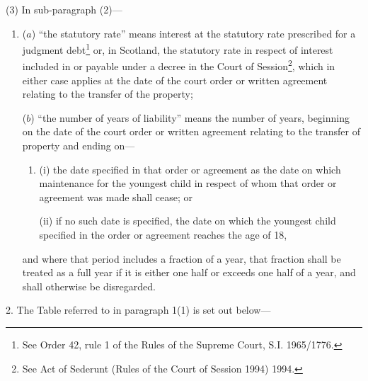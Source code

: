 \documentclass[a4paper]{article}
\begin{document}
(3) In sub-paragraph (2)—
\begin{enumerate}\item[]
($a$) “the statutory rate” means interest at the statutory rate prescribed for a
judgment debt\footnote{\frenchspacing See Order 42, rule 1 of the Rules of the Supreme Court, S.I. 1965/1776.} or, in Scotland, the statutory rate in respect of interest
included in or payable under a decree in the Court of Session\footnote{\frenchspacing See Act of Sederunt (Rules of the Court of Session 1994) 1994.}, which in
either case applies at the date of the court order or written agreement relating
to the transfer of the property;

($b$) “the number of years of liability” means the number of years, beginning on
the date of the court order or written agreement relating to the transfer of
property and ending on—
\begin{enumerate}\item[]
(i) the date specified in that order or agreement as the date on which
maintenance for the youngest child in respect of whom that order or agreement
was made shall cease; or

(ii) if no such date is specified, the date on which the youngest child specified
in the order or agreement reaches the age of 18,
\end{enumerate}
and where that period includes a fraction of a year, that fraction shall be
treated as a full year if it is either one half or exceeds one half of a year,
and shall otherwise be disregarded.
\end{enumerate}

\medskip

2.  The Table referred to in paragraph 1(1) is set out below—
\end{document}
